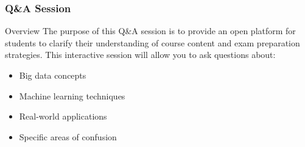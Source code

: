 \documentclass[aspectratio=169]{beamer}
\begin{document}
\begin{frame}[fragile]
    \frametitle{Q\&A Session}
    \begin{block}{Overview}
        The purpose of this Q\&A session is to provide an open platform for students to clarify their understanding of course content and exam preparation strategies. 
        This interactive session will allow you to ask questions about:
        \begin{itemize}
            \item Big data concepts
            \item Machine learning techniques
            \item Real-world applications
            \item Specific areas of confusion
        \end{itemize}
    \end{block}
\end{frame}
\end{document}
